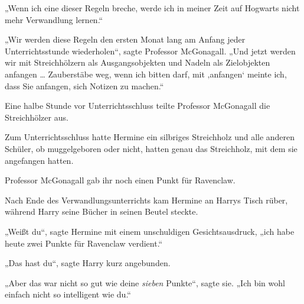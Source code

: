 „Wenn ich eine dieser Regeln breche, werde ich in meiner Zeit auf Hogwarts nicht mehr Verwandlung lernen.“ 

„Wir werden diese Regeln den ersten Monat lang am Anfang jeder Unterrichtsstunde wiederholen“, sagte Professor McGonagall. „Und jetzt werden wir mit Streichhölzern als Ausgangsobjekten und Nadeln als Zielobjekten anfangen … Zauberstäbe weg, wenn ich bitten darf, mit ‚anfangen‘ meinte ich, dass Sie anfangen, sich Notizen zu machen.“ 

Eine halbe Stunde vor Unterrichtsschluss teilte Professor McGonagall die Streichhölzer aus. 

Zum Unterrichtsschluss hatte Hermine ein silbriges Streichholz und alle anderen Schüler, ob muggelgeboren oder nicht, hatten genau das Streichholz, mit dem sie angefangen hatten. 

Professor McGonagall gab ihr noch einen Punkt für Ravenclaw. 

\later

Nach Ende des Verwandlungsunterrichts kam Hermine an Harrys Tisch rüber, während Harry seine Bücher in seinen Beutel steckte. 

„Weißt du“, sagte Hermine mit einem unschuldigen Gesichtsausdruck, „ich habe heute zwei Punkte für Ravenclaw verdient.“ 

„Das hast du“, sagte Harry kurz angebunden. 

„Aber das war nicht so gut wie deine \emph{sieben} Punkte“, sagte sie. „Ich bin wohl einfach nicht so intelligent wie du.“ 

